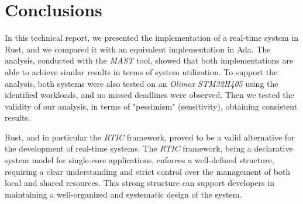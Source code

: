 \section{Conclusions}

In this technical report, we presented the implementation of a real-time system
in Rust, and we compared it with an equivalent implementation in Ada. The
analysis, conducted with the \textit{MAST} tool, showed that both
implementations are able to achieve similar results in terms of system
utilization. To support the analysis, both systems were also tested on an
\textit{Olimex STM32\-H405} \cite{olimexSTM32H405} using the identified
workloads, and no missed deadlines were observed. Then we tested the validity of
our analysis, in terms of "pessimism" (sensitivity), obtaining consistent
results.

Rust, and in particular the \textit{RTIC} framework, proved to be a
valid alternative for the development of real-time systems.
The \textit{RTIC} framework, being a declarative system model for
single-core applications, enforces a well-defined structure,
requiring a clear understanding and strict control over the management of both
local and shared resources. This strong structure can support developers in
maintaining a well-organized and systematic design of the system.

